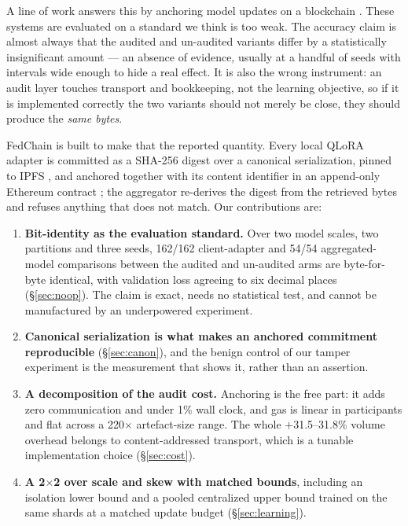 \documentclass[11pt]{article}
\begin{document}
A line of work answers this by anchoring model updates on a blockchain \cite{kim2020blockchained,lu2020blockchain,warnat2021swarm}. These systems are evaluated on a standard we think is too weak. The accuracy claim is almost always that the audited and un-audited variants differ by a statistically insignificant amount --- an absence of evidence, usually at a handful of seeds with intervals wide enough to hide a real effect. It is also the wrong instrument: an audit layer touches transport and bookkeeping, not the learning objective, so if it is implemented correctly the two variants should not merely be close, they should produce the \emph{same bytes}.

FedChain is built to make that the reported quantity. Every local QLoRA adapter is committed as a SHA-256 digest over a canonical serialization, pinned to IPFS \cite{benet2014ipfs}, and anchored together with its content identifier in an append-only Ethereum contract \cite{wood2014ethereum}; the aggregator re-derives the digest from the retrieved bytes and refuses anything that does not match. Our contributions are:

\begin{enumerate}[noitemsep,topsep=2pt,leftmargin=*]
\item \textbf{Bit-identity as the evaluation standard.} Over two model scales, two partitions and three seeds, 162/162 client-adapter and 54/54 aggregated-model comparisons between the audited and un-audited arms are byte-for-byte identical, with validation loss agreeing to six decimal places (\S\ref{sec:noop}). The claim is exact, needs no statistical test, and cannot be manufactured by an underpowered experiment.
\item \textbf{Canonical serialization is what makes an anchored commitment reproducible} (\S\ref{sec:canon}), and the benign control of our tamper experiment is the measurement that shows it, rather than an assertion.
\item \textbf{A decomposition of the audit cost.} Anchoring is the free part: it adds zero communication and under 1\% wall clock, and gas is linear in participants and flat across a 220$\times$ artefact-size range. The whole $+$31.5--31.8\% volume overhead belongs to content-addressed transport, which is a tunable implementation choice (\S\ref{sec:cost}).
\item \textbf{A 2$\times$2 over scale and skew with matched bounds}, including an isolation lower bound and a pooled centralized upper bound trained on the same shards at a matched update budget (\S\ref{sec:learning}).
\end{enumerate}
\end{document}
